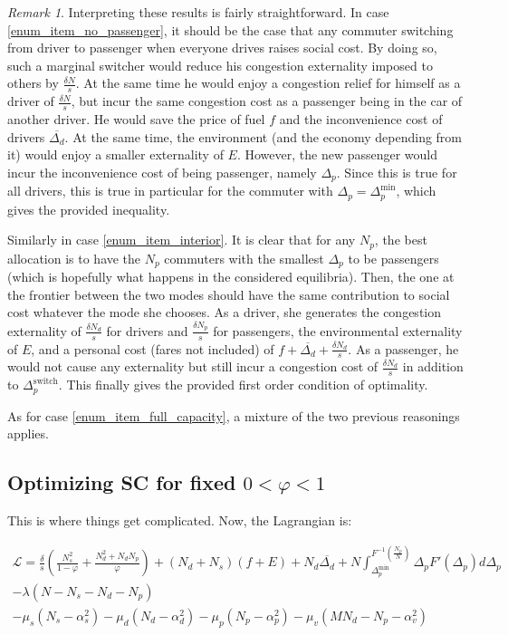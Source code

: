\documentclass[english, a4paper]{article}
\theoremstyle{plain}
\theoremstyle{definition}
\theoremstyle{remark}
\newtheorem{remark}{Remark}
\begin{document}
\begin{remark}
    Interpreting these results is fairly straightforward. In case \ref{enum_item_no_passenger}, it should be the case that any commuter switching from driver to passenger when everyone drives raises social cost. By doing so, such a marginal switcher would reduce his congestion externality imposed to others by $\frac{\delta N}{s}$. At the same time he would enjoy a congestion relief for himself as a driver of $\frac{\delta N}{s}$, but incur the same congestion cost as a passenger being in the car of another driver. He would save the price of fuel $f$ and the inconvenience cost of drivers $\overline{\Delta_d}$. At the same time, the environment (and the economy depending from it) would enjoy a smaller externality of $E$. However, the new passenger would incur the inconvenience cost of being passenger, namely $\Delta _p$. Since this is true for all drivers, this is true in particular for the commuter with $\Delta_p = \Delta_p^{\text{min}}$, which gives the provided inequality.

    Similarly in case \ref{enum_item_interior}. It is clear that for any $N_p$, the best allocation is to have the $N_p$ commuters with the smallest $\Delta_p$ to be passengers (which is hopefully what happens in the considered equilibria). Then, the one at the frontier between the two modes should have the same contribution to social cost whatever the mode she chooses. As a driver, she generates the congestion externality of $\frac{\delta N_d}{s}$ for drivers and $\frac{\delta N_p}{s}$ for passengers, the environmental externality of $E$, and a personal cost (fares not included) of $f + \overline{\Delta_d} + \frac{\delta N_d}{s}$. As a passenger, he would not cause any externality but still incur a congestion cost of $\frac{\delta N_d}{s}$ in addition to $\Delta_p^{\text{switch}}$. This finally gives the provided first order condition of optimality.

    As for case \ref{enum_item_full_capacity}, a mixture of the two previous reasonings applies.
\end{remark}


\subsection{Optimizing SC for fixed $0 < \varphi < 1$}

This is where things get complicated. Now, the Lagrangian is:

\begin{multline}
    \mathcal{L} = \frac{\delta}{s}\left( \frac{N_s^2}{1-\varphi} + \frac{N_d^2 + N_d N_p}{\varphi}\right) + (N_d + N_s)(f+E) + N_d \overline{\Delta_d} + N \int_{\Delta_p^{\text{min}}}^{F^{-1}\left( \frac{N_p}{N} \right)} \Delta_p F'(\Delta_p) d \Delta_p\\
    -\lambda(N - N_s - N_d - N_p)\\
    -\mu_s(N_s - \alpha_s^2) -\mu_d(N_d - \alpha_d^2) -\mu_p(N_p - \alpha_p^2) -\mu_v(MN_d - N_p - \alpha_v^2)
\end{multline}
\end{document}
